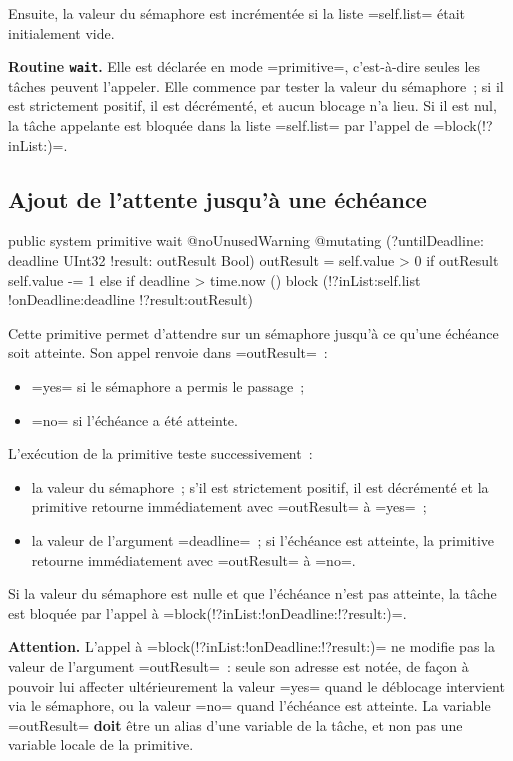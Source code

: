 Ensuite, la valeur du sémaphore est incrémentée si la liste \plm=self.list= était initialement vide.


{\bf Routine \texttt{wait}.} Elle est déclarée en mode \plm=primitive=, c'est-à-dire seules les tâches peuvent l'appeler. Elle commence par tester la valeur du sémaphore~; si il est strictement positif, il est décrémenté, et aucun blocage n'a lieu. Si il est nul, la tâche appelante est bloquée dans la liste \plm=self.list= par l'appel de \plm=block(!?inList:)=.


\subsection{Ajout de l'attente jusqu'à une échéance}

\begin{PLM}
public system primitive wait
@noUnusedWarning @mutating (?untilDeadline: deadline UInt32
                            !result: outResult Bool) {
  outResult = self.value > 0
  if outResult {
    self.value -= 1
  }else if deadline > time.now () { 
    block (!?inList:self.list !onDeadline:deadline !?result:outResult)
  }
}
\end{PLM}

Cette primitive permet d'attendre sur un sémaphore jusqu'à ce qu'une échéance soit atteinte. Son appel renvoie dans \plm=outResult=~:
\begin{itemize}
  \item \plm=yes= si le sémaphore a permis le passage~;
  \item \plm=no= si l'échéance a été atteinte.
\end{itemize}

L'exécution de la primitive teste successivement~:
\begin{itemize}
  \item la valeur du sémaphore~; s'il est strictement positif, il est décrémenté et la primitive retourne immédiatement avec \plm=outResult= à \plm=yes=~;
  \item la valeur de l'argument \plm=deadline=~; si l'échéance est atteinte, la primitive retourne immédiatement avec \plm=outResult= à \plm=no=.
\end{itemize}

Si la valeur du sémaphore est nulle et que l'échéance n'est pas atteinte, la tâche est bloquée par l'appel à \plm=block(!?inList:!onDeadline:!?result:)=.

{\bf Attention.} L'appel à \plm=block(!?inList:!onDeadline:!?result:)= ne modifie pas la valeur de l'argument \plm=outResult=~: seule son adresse est notée, de façon à pouvoir lui affecter ultérieurement la valeur \plm=yes= quand le déblocage intervient via le sémaphore, ou la valeur \plm=no= quand l'échéance est atteinte. La variable \plm=outResult= {\bf doit} être un alias d'une variable de la tâche, et non pas une variable locale de la primitive.




